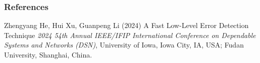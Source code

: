 \documentclass[
	12pt, %
]{beamer}
\begin{document}

\begin{frame} %
	\frametitle{References}
	
	\begin{thebibliography}{99} %
		\footnotesize %
		
			Zhengyang He, Hui Xu, Guanpeng Li (2024)
			\newblock A Fast Low-Level Error Detection Technique
			\newblock \emph{2024 54th Annual IEEE/IFIP International Conference on Dependable Systems and Networks (DSN)}, University of Iowa, Iowa City, IA, USA; Fudan University, Shanghai, China.
		
		
	\end{thebibliography}
\end{frame}


%	
\end{document}
